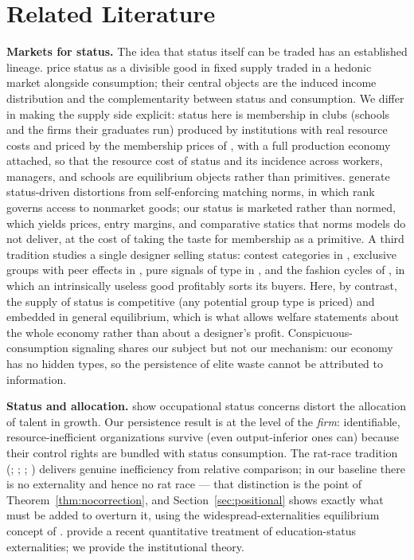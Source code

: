 \documentclass[12pt,letterpaper]{article}
\theoremstyle{definition}
\begin{document}
\section{Related Literature}\label{sec:lit}

\textbf{Markets for status.}
The idea that status itself can be traded has an established lineage.
\citet{beckermurphywerning2005} price status as a divisible good in fixed supply traded in a hedonic market alongside consumption; their central objects are the induced income distribution and the complementarity between status and consumption.
We differ in making the supply side explicit: status here is membership in clubs (schools and the firms their graduates run) produced by institutions with real resource costs and priced by the membership prices of \citet{ellickson1999clubs}, with a full production economy attached, so that the resource cost of status and its incidence across workers, managers, and schools are equilibrium objects rather than primitives.
\citet{colemailathpostlewaite1992} generate status-driven distortions from self-enforcing matching norms, in which rank governs access to nonmarket goods; our status is marketed rather than normed, which yields prices, entry margins, and comparative statics that norms models do not deliver, at the cost of taking the taste for membership as a primitive.
A third tradition studies a single designer selling status: contest categories in \citet{moldovanuselashi2007}, exclusive groups with peer effects in \citet{board2009group}, pure signals of type in \citet{rayo2013signal}, and the fashion cycles of \citet{pesendorfer1995fashion}, in which an intrinsically useless good profitably sorts its buyers.
Here, by contrast, the supply of status is competitive (any potential group type is priced) and embedded in general equilibrium, which is what allows welfare statements about the whole economy rather than about a designer's profit.
Conspicuous-consumption signaling \citep{bagwellbernheim1996veblen} shares our subject but not our mechanism: our economy has no hidden types, so the persistence of elite waste cannot be attributed to information.

\textbf{Status and allocation.}
\citet{fershtmanmurphyweiss1996} show occupational status concerns distort the allocation of talent in growth.
Our persistence result is at the level of the \emph{firm}: identifiable, resource-inefficient organizations survive (even output-inferior ones can) because their control rights are bundled with status consumption.
The rat-race tradition (\citealt{akerlof1976caste}; \citealt{hopkinskornienko2004}; \citealt{frank1985demand}; \citealt{hirsch1976social}) delivers genuine inefficiency from relative comparison; in our baseline there is no externality and hence no rat race --- that distinction is the point of Theorem~\ref{thm:nocorrection}, and Section~\ref{sec:positional} shows exactly what must be added to overturn it, using the widespread-externalities equilibrium concept of \citet{noguchizame2006externalities}.
\citet{kimtertiltyum2024} provide a recent quantitative treatment of education-status externalities; we provide the institutional theory.
\end{document}
